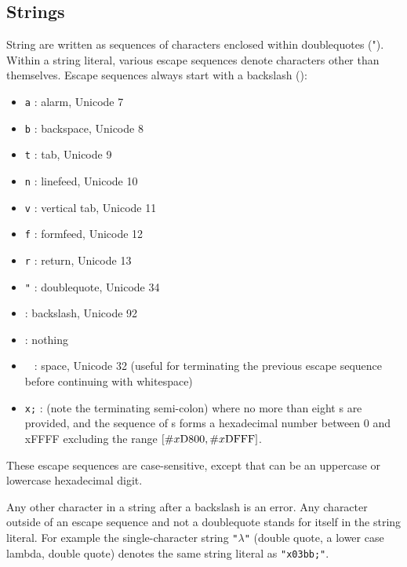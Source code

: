 \subsection{Strings}

\vest String are written as sequences of characters enclosed within doublequotes
({\cf "}).  Within a string literal, various escape
sequences denote characters other than
themselves.  Escape sequences always start with a backslash (\backwhack{}):

\begin{itemize}
\item{\tt \backwhack{}a} : alarm, Unicode 7
\item{\tt \backwhack{}b} : backspace, Unicode 8 
\item{\tt \backwhack{}t} : tab, Unicode 9 
\item{\tt \backwhack{}n} : linefeed, Unicode 10 
\item{\tt \backwhack{}v} : vertical tab, Unicode 11 
\item{\tt \backwhack{}f} : formfeed, Unicode 12 
\item{\tt \backwhack{}r} : return, Unicode 13 
\item{\tt \backwhack{}}\verb|"| : doublequote, Unicode 34 
\item{\tt \backwhack{}\backwhack{}} : backslash, Unicode 92 
\item{\tt \backwhack{}} : nothing
\item{\tt \backwhack{}\ } : space, Unicode 32 (useful for terminating the
  previous escape sequence before continuing with whitespace)
\item{\tt \backwhack{}x;} : (note the
  terminating semi-colon) where no more than eight s
  are provided, and the sequence of s forms a
  hexadecimal number between 0 and \sharpsign{}xFFFF excluding the
  range $\left[{\tt\#}{}x\textrm{D800},
    {\tt\#}{}x\textrm{DFFF}\right]$.
\end{itemize}

These escape sequences are case-sensitive, except that  can be an uppercase or lowercase hexadecimal digit.

Any other character in a string after a backslash is an error. Any
character outside of an escape sequence and not a doublequote stands
for itself in the string literal. For example the single-character
string {\tt "$\lambda$"} (double quote, a lower case lambda, double
quote) denotes the same string literal as {\tt "\backwhack{}x03bb;"}.

